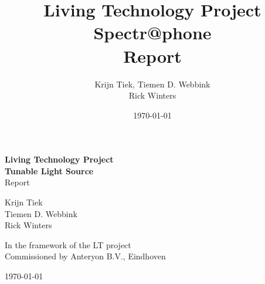 \documentclass[1pt, a4paper]{book}
\title{Living Technology Project \\ Spectr@phone \\ Report}
\author{Krijn Tiek, Tiemen D. Webbink \\ Rick Winters}
\date{\today}
\begin{document}

\begin{titlepage}
    \begin{center}
        \vspace*{1cm}
        
        \begin{Huge}
        \textbf{Living Technology Project \\ Tunable Light Source}\\
        Report\\

        \end{Huge}
        
        \vspace{4cm}
        
        
        \vfill
        
        \begin{small}
        Krijn Tiek\\
        Tiemen D. Webbink\\
        Rick Winters\\
        \end{small}
        
        \vspace{1cm}
        
        \begin{large}
        In the framework of the LT project \\
        Commissioned by Anteryon B.V., Eindhoven
        \end{large}
        
        \vspace{0.5cm}
        \today  

    \end{center}
\end{titlepage}

\newpage


\tableofcontents

\newpage
\listoffigures

%

\newpage
 


\newpage
\begin{appendices}

\end{appendices}
\end{document}
